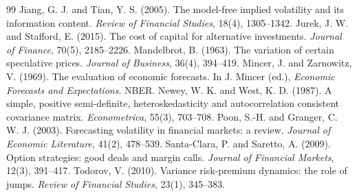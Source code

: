 \documentclass[11pt,a4paper]{article}
\begin{document}
\begin{thebibliography}{99}
\bibitem{} Jiang, G. J. and Tian, Y. S. (2005). The model-free implied volatility and its information content. \emph{Review of Financial Studies}, 18(4), 1305--1342.
\bibitem{} Jurek, J. W. and Stafford, E. (2015). The cost of capital for alternative investments. \emph{Journal of Finance}, 70(5), 2185--2226.
\bibitem{} Mandelbrot, B. (1963). The variation of certain speculative prices. \emph{Journal of Business}, 36(4), 394--419.
\bibitem{} Mincer, J. and Zarnowitz, V. (1969). The evaluation of economic forecasts. In J. Mincer (ed.), \emph{Economic Forecasts and Expectations}. NBER.
\bibitem{} Newey, W. K. and West, K. D. (1987). A simple, positive semi-definite, heteroskedasticity and autocorrelation consistent covariance matrix. \emph{Econometrica}, 55(3), 703--708.
\bibitem{} Poon, S.-H. and Granger, C. W. J. (2003). Forecasting volatility in financial markets: a review. \emph{Journal of Economic Literature}, 41(2), 478--539.
\bibitem{} Santa-Clara, P. and Saretto, A. (2009). Option strategies: good deals and margin calls. \emph{Journal of Financial Markets}, 12(3), 391--417.
\bibitem{} Todorov, V. (2010). Variance risk-premium dynamics: the role of jumps. \emph{Review of Financial Studies}, 23(1), 345--383.
\end{thebibliography}
\end{document}
